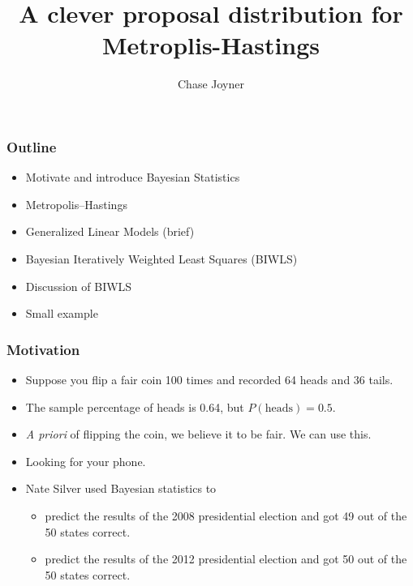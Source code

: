 \documentclass[black]{beamer}
\title{A clever proposal distribution for Metroplis-Hastings}
\author{Chase Joyner}
\institute{MATH 802}
\date
\newcommand*\Myitem{%
    \item[\color{CUpurple}{\ding{111}}]}
\begin{document}
\begin{frame}
  \titlepage
\end{frame}

\begin{frame}
\frametitle{Outline}
\begin{itemize}
\item Motivate and introduce Bayesian Statistics
\vspace{0.2cm}
\item Metropolis--Hastings
\vspace{0.2cm}
\item Generalized Linear Models (brief)
\vspace{0.2cm}
\item Bayesian Iteratively Weighted Least Squares (BIWLS)
\vspace{0.2cm}
\item Discussion of BIWLS
\vspace{0.2cm}
\item Small example
\end{itemize}
\end{frame}

\begin{frame}
\frametitle{Motivation}
\begin{itemize}
\item Suppose you flip a fair coin 100 times and recorded 64 heads and 36 tails.
\vspace{0.2cm}
\item The sample percentage of heads is 0.64, but $P(\text{heads}) = 0.5$.
\vspace{0.2cm}
\item {\it A priori} of flipping the coin, we believe it to be fair.  We can use this.
\vspace{0.2cm}
\item Looking for your phone.
\vspace{0.2cm}
\item Nate Silver used Bayesian statistics to
\vspace{0.2cm}
\begin{itemize}
\Myitem predict the results of the 2008 presidential election and got 49 out of the 50 states correct.
\vspace{0.1cm}
\Myitem predict the results of the 2012 presidential election and got 50 out of the 50 states correct.
\end{itemize}
\end{itemize}
\end{frame}
\end{document}
